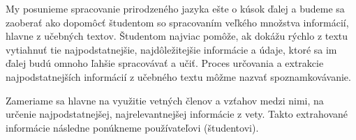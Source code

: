 My posunieme spracovanie prirodzeného jazyka ešte o kúsok ďalej a budeme sa zaoberať ako dopomôcť študentom so spracovaním veľkého množstva informácií, hlavne z učebných textov. Študentom najviac pomôže, ak dokážu rýchlo z textu vytiahnuť tie najpodstatnejšie, najdôležitejšie informácie a údaje, ktoré sa im ďalej budú omnoho ľahšie spracovávať a učiť. Proces určovania a extrakcie najpodstatnejších informácií z učebného textu môžme nazvať spoznamkovávanie.

Zameriame sa hlavne na využitie vetných členov a vzťahov medzi nimi, na určenie najpodstatnejšej, najrelevantnejšej informácie z vety. Takto extrahované informácie následne ponúkneme používateľovi (študentovi).